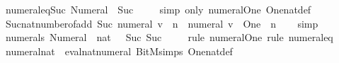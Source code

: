 \begin{isabellebody}
\ numeral{\isacharunderscore}{\kern0pt}{}{\isacharunderscore}{\kern0pt}eq{\isacharunderscore}{\kern0pt}Suc{\isacharunderscore}{\kern0pt}{}{\isacharcolon}{\kern0pt}\ {\isachardoublequoteopen}Numeral{}\ {\isacharequal}{\kern0pt}\ Suc\ {}{\isachardoublequoteclose}\isanewline
%
\isadelimproof
\ \ %
\endisadelimproof
%
\isatagproof
{}\isamarkupfalse%
\ {\isacharparenleft}{\kern0pt}simp\ only{\isacharcolon}{\kern0pt}\ numeral{\isacharunderscore}{\kern0pt}One\ One{\isacharunderscore}{\kern0pt}nat{\isacharunderscore}{\kern0pt}def{\isacharparenright}{\kern0pt}%
\endisatagproof
{\isafoldproof}%
%
\isadelimproof
\isanewline
%
\endisadelimproof
\isanewline
{}\isamarkupfalse%
\ Suc{\isacharunderscore}{\kern0pt}nat{\isacharunderscore}{\kern0pt}number{\isacharunderscore}{\kern0pt}of{\isacharunderscore}{\kern0pt}add{\isacharcolon}{\kern0pt}\ {\isachardoublequoteopen}Suc\ {\isacharparenleft}{\kern0pt}numeral\ v\ {\isacharplus}{\kern0pt}\ n{\isacharparenright}{\kern0pt}\ {\isacharequal}{\kern0pt}\ numeral\ {\isacharparenleft}{\kern0pt}v\ {\isacharplus}{\kern0pt}\ One{\isacharparenright}{\kern0pt}\ {\isacharplus}{\kern0pt}\ n{\isachardoublequoteclose}\isanewline
%
\isadelimproof
\ \ %
\endisadelimproof
%
\isatagproof
{}\isamarkupfalse%
\ simp%
\endisatagproof
{\isafoldproof}%
%
\isadelimproof
\isanewline
%
\endisadelimproof
\isanewline
{}\isamarkupfalse%
\ numerals{\isacharcolon}{\kern0pt}\ {\isachardoublequoteopen}Numeral{}\ {\isacharequal}{\kern0pt}\ {\isacharparenleft}{\kern0pt}{}{\isacharcolon}{\kern0pt}{\isacharcolon}{\kern0pt}nat{\isacharparenright}{\kern0pt}{\isachardoublequoteclose}\ {\isachardoublequoteopen}{}\ {\isacharequal}{\kern0pt}\ Suc\ {\isacharparenleft}{\kern0pt}Suc\ {}{\isacharparenright}{\kern0pt}{\isachardoublequoteclose}\isanewline
%
\isadelimproof
\ \ %
\endisadelimproof
%
\isatagproof
{}\isamarkupfalse%
\ {\isacharparenleft}{\kern0pt}rule\ numeral{\isacharunderscore}{\kern0pt}One{\isacharparenright}{\kern0pt}\ {\isacharparenleft}{\kern0pt}rule\ numeral{\isacharunderscore}{\kern0pt}{}{\isacharunderscore}{\kern0pt}eq{\isacharunderscore}{\kern0pt}{}{\isacharparenright}{\kern0pt}%
\endisatagproof
{\isafoldproof}%
%
\isadelimproof
\isanewline
%
\endisadelimproof
\isanewline
{}\isamarkupfalse%
\ numeral{\isacharunderscore}{\kern0pt}nat\ {\isacharequal}{\kern0pt}\ eval{\isacharunderscore}{\kern0pt}nat{\isacharunderscore}{\kern0pt}numeral\ BitM{\isachardot}{\kern0pt}simps\ One{\isacharunderscore}{\kern0pt}nat{\isacharunderscore}{\kern0pt}def%

\end{isabellebody}
